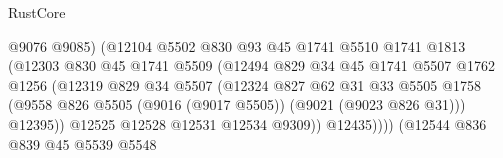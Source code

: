 \begin{lexlean}{RustCore}
\begin{coremodule}
                                        @9076
                                        @9085)
                                      (@12104
                                        @5502
                                        @830
                                        @93
                                        @45
                                        @1741
                                        @5510
                                        @1741
                                        @1813
                                        (@12303
                                          @830
                                          @45
                                          @1741
                                          @5509
                                          (@12494
                                            @829
                                            @34
                                            @45
                                            @1741
                                            @5507
                                            @1762
                                            @1256
                                            (@12319
                                              @829
                                              @34
                                              @5507
                                              (@12324
                                                @827
                                                @62
                                                @31
                                                @33
                                                @5505
                                                @1758
                                                (@9558
                                                  @826
                                                  @5505
                                                  (@9016 (@9017 @5505))
                                                  (@9021 (@9023 @826 @31)))
                                                @12395))
                                            @12525
                                            @12528
                                            @12531
                                            @12534
                                            @9309))
                                        @12435))))
                                (@12544
                                  @836
                                  @839
                                  @45
                                  @5539
                                  @5548

\end{coremodule}
\end{lexlean}
